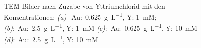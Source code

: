 		\begin{figure}[H]
			\centering
			\\
			\caption{TEM-Bilder nach Zugabe von Yttriumchlorid mit den Konzentrationen: \emph{(a)}:~Au:~\SI{0,625}{\gram\per\liter}, Y: 1~mM;
			\emph{(b)}:~Au:~\SI{2,5}{\gram\per\liter}, Y: 1~mM
			\emph{(c)}:~Au:~\SI{0,625}{\gram\per\liter}, Y: 10~mM
			\emph{(d)}:~Au:~\SI{2,5}{\gram\per\liter}, Y: 10~mM} 
			\label{fig:Y-Gele}
		\end{figure}
		
